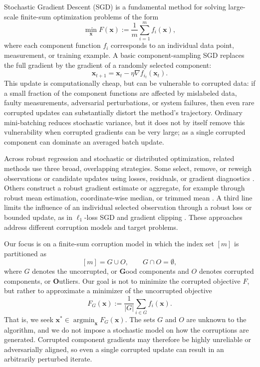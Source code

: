 \documentclass[11pt]{article}
\newcommand{\ve}[1]{\mathbf{#1}}
\begin{document}
Stochastic Gradient Descent (SGD) is a fundamental method for solving large-scale
finite-sum optimization problems of the form
\begin{equation}
\min_{\ve{x}} F(\ve{x})
:=
\frac{1}{m}\sum_{i=1}^m f_i(\ve{x}),
\label{eq:prob}
\end{equation}
where each component function \(f_i\) corresponds to an individual data point,
measurement, or training example. {A basic component-sampling  SGD replaces the full gradient by the gradient of a randomly selected
component: \begin{equation}
   \ve{x}_{t+1}
        =
        \ve{x}_t-\eta\nabla f_{i_t}(\ve{x}_t).
        \label{eq:sgd}
\end{equation}}
This update is computationally cheap, but can be vulnerable to corrupted
data: if a small fraction of the component functions are affected by mislabeled
data, faulty measurements, adversarial perturbations, or system failures, then
even rare corrupted updates can substantially distort the method's trajectory. Ordinary mini-batching reduces stochastic variance, but it does not by itself
remove this vulnerability when corrupted gradients can be very large; as a
single corrupted component can dominate an averaged batch update.

Across robust regression and stochastic or distributed optimization, related
methods use three broad, overlapping strategies. Some select, remove, or
reweigh observations or candidate updates using losses, residuals, or gradient
diagnostics
\citep{bhatia2015robust,shen2019learning,diakonikolas2019sever}.
Others construct a robust gradient estimate or aggregate, for example through
robust mean estimation, coordinate-wise median, or trimmed mean
\citep{prasad2020robust,yin2018byzantine}. A third line limits the influence
of an individual selected observation through a robust loss or bounded update,
as in \(\ell_1\)-loss SGD and gradient clipping
\citep{pesme2020online,jeong2025stochastic,gorbunov2020stochastic}.
These approaches address different corruption models and target problems.


Our focus is on a finite-sum corruption model in which the index set \([m]\) is
partitioned as
\[
[m]=G\cup O,
\qquad
G\cap O=\emptyset,
\]
{where \(G\) denotes the uncorrupted, or \textbf{G}ood components and \(O\) denotes corrupted components, or \textbf{O}utliers.} Our goal
is not to minimize the corrupted objective \(F\), but rather to approximate a
minimizer of the uncorrupted objective
\begin{equation}
F_G(\ve{x})
:=
\frac{1}{|G|}\sum_{i\in G} f_i(\ve{x}).
\label{eq:prob_good}
\end{equation}
That is, we seek
\(\ve{x}^*\in\operatorname*{argmin}_{\ve{x}} F_G(\ve{x})\).
The sets \(G\) and \(O\) are unknown to the algorithm, and we do not impose a
stochastic model on how the corruptions are generated. Corrupted component
gradients may therefore be highly unreliable or adversarially aligned, so even
a single corrupted update can result in an arbitrarily perturbed iterate.
\end{document}
